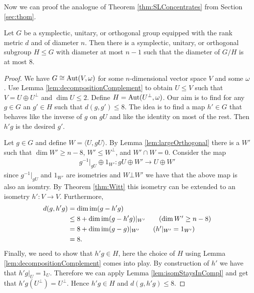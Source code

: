 Now we can proof the analogue of Theorem \ref{thm:SLConcentrates} from Section \ref{sec:thom}.


\begin{theorem}\label{thm:suoBoundDiam}

Let $G$ be a symplectic, unitary, or orthogonal group equipped with the rank metric $d$ and of diameter $n$. Then there is a symplectic, unitary, or orthogonal subgroup $H\leq G$ with diameter at most $n-1$ such that the diameter of $G/H$ is at most $8$.
\end{theorem}
\begin{proof}
We have $G\cong\operatorname{Aut}(V,\omega)$ for some $n$-dimensional vector space $V$ and some $\omega$. Use Lemma \ref{lem:decompositionComplement} to obtain $U\leq V$ such that $V=U\oplus U^\bot$ and $\dim U\leq2$. Define $H=\operatorname{Aut}(U^\bot,\omega)$. Our aim is to find for any $g\in G$ an $g'\in H$ such that $d(g,g')\leq8$.
The idea is to find a map $h'\in G$ that behaves like the inverse of $g$ on $gU$ and like the identity on most of the rest. Then $h'g$ is the desired $g'$.

Let $g\in G$ and define $W=\langle U,gU\rangle$. By Lemma \ref{lem:largeOrthogonal} there is a $W'$ such that $\dim W'\geq n-8$, $W'\leq W^\bot$, and $W'\cap W=0$. Consider the map
\begin{align*}
 g^{-1}|_{gU}\oplus 1_{W'}\colon gU\oplus W'\to U\oplus W'
\end{align*}
since $g^{-1}|_{gU}$ and $1_{W'}$ are isometries and $W\bot W'$ we have that the above map is also an isomtry. By Theorem \ref{thm:Witt} this isometry can be extended to an isometry $h'\colon V\to V$. Furthermore,
\begin{align*}
 d(g,h'g)&=\dim\im (g-h'g)\\
&\leq 8+\dim \im(g-h'g)|_{W'}\tag{$\dim W'\geq n-8$}\\
&= 8+\dim \im(g-g)|_{W'}\tag{$h'|_{W'}=1_{W'}$}\\
&=8.
\end{align*}
Finally, we need to show that $h'g\in H$, here the choice of $H$ using Lemma \ref{lem:decompositionComplement} comes into play. By construction of $h'$ we have that $h'g|_U=1_U$. Therefore we can apply Lemma \ref{lem:isomStaysInCompl} and get that $h'g(U^\bot)= U^\bot$. Hence $h'g\in H$ and $d(g,h'g)\leq8$.

\end{proof}

